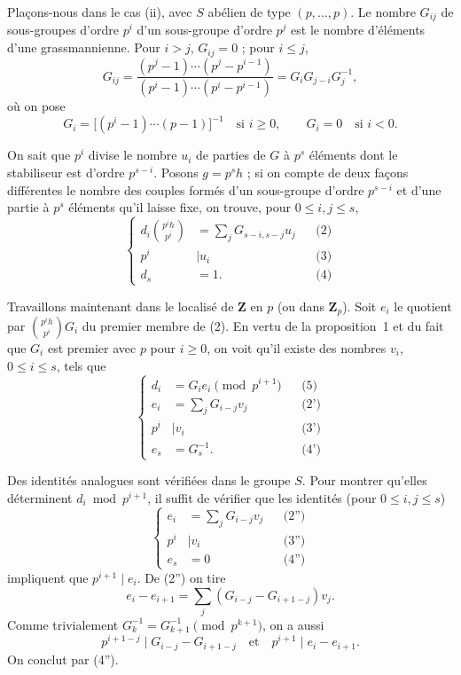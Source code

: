 \documentclass[11pt]{article}
\newcommand{\Z}{\mathbf{Z}}
\begin{document}
Plaçons-nous dans le cas (ii), avec \(S\) abélien de type \((p,\ldots,p)\).
Le nombre \(G_{ij}\) de sous-groupes d'ordre \(p^i\) d'un sous-groupe d'ordre
\(p^j\) est le nombre d'éléments d'une grassmannienne. Pour \(i>j\),
\(G_{ij}=0\) ; pour \(i\leq j\),
\[
        G_{ij}
        =\frac{(p^j-1)\cdots(p^j-p^{i-1})}
              {(p^i-1)\cdots(p^i-p^{i-1})}
        =G_iG_{j-i}G_j^{-1},
\]
où on pose
\[
        G_i=\bigl[(p^i-1)\cdots(p-1)\bigr]^{-1}\quad\text{si }i\geq0,
        \qquad
        G_i=0\quad\text{si }i<0.
\]

On sait que \(p^i\) divise le nombre \(u_i\) de parties de \(G\) à \(p^s\)
éléments dont le stabiliseur est d'ordre \(p^{s-i}\). Posons \(g=p^s h\) ; si
on compte de deux façons différentes le nombre des couples formés d'un
sous-groupe d'ordre \(p^{s-i}\) et d'une partie à \(p^s\) éléments qu'il laisse
fixe, on trouve, pour \(0\leq i,j\leq s\),
\[
\left\{
\begin{aligned}
 d_i\binom{p^i h}{p^i}&=\sum_j G_{s-i,s-j}u_j &&\text{(2)}\\
 p^i&\mid u_i &&\text{(3)}\\
 d_s&=1. &&\text{(4)}
\end{aligned}
\right.
\]

Travaillons maintenant dans le localisé de \(\Z\) en \(p\) (ou dans \(\Z_p\)).
Soit \(e_i\) le quotient par \(\binom{p^i h}{p^i}G_i\) du premier membre de (2).
En vertu de la proposition~1 et du fait que \(G_i\) est premier avec \(p\) pour
\(i\geq0\), on voit qu'il existe des nombres \(v_i\), \(0\leq i\leq s\), tels
que
\[
\left\{
\begin{aligned}
 d_i&=G_i e_i \pmod {p^{i+1}} &&\text{(5)}\\
 e_i&=\sum_j G_{i-j}v_j &&\text{(2')}\\
 p^i&\mid v_i &&\text{(3')}\\
 e_s&=G_s^{-1}. &&\text{(4')}
\end{aligned}
\right.
\]

Des identités analogues sont vérifiées dans le groupe \(S\). Pour montrer
qu'elles déterminent \(d_i\bmod p^{i+1}\), il suffit de vérifier que les
identités (pour \(0\leq i,j\leq s\))
\[
\left\{
\begin{aligned}
 e_i&=\sum_j G_{i-j}v_j &&\text{(2'')}\\
 p^i&\mid v_i &&\text{(3'')}\\
 e_s&=0 &&\text{(4'')}
\end{aligned}
\right.
\]
impliquent que \(p^{i+1}\mid e_i\). De (2'') on tire
\[
        e_i-e_{i+1}=\sum_j (G_{i-j}-G_{i+1-j})v_j .
\]
Comme trivialement \(G_k^{-1}=G_{k+1}^{-1}\pmod {p^{k+1}}\), on a aussi
\[
        p^{i+1-j}\mid G_{i-j}-G_{i+1-j}
        \quad\text{et}\quad
        p^{i+1}\mid e_i-e_{i+1}.
\]
On conclut par (4'').
\end{document}
